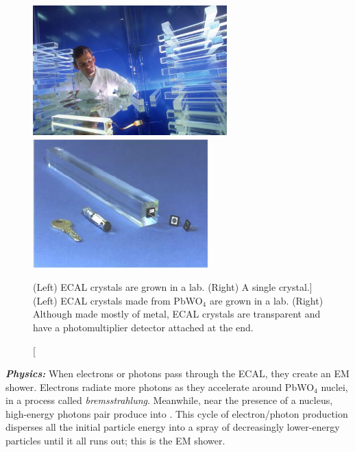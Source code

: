 \begin{figure}[pbth]
    \centering
    \includegraphics[height=5cm,keepaspectratio]{figures/cms/ecal/ECAL_crystals_fancy_lab.jpg}
    \includegraphics[height=5cm,keepaspectratio]{figures/cms/ecal/ECAL_crystal_sizecomparison.jpg}
    \caption
        [(Left) ECAL crystals are grown in a lab. (Right) A single crystal.]
        {
        (Left) ECAL crystals made from PbWO$_4$ are grown in a lab.
        (Right) Although made mostly of metal, ECAL crystals are transparent and have a photomultiplier detector attached at the end.
        } 
    \label{fig:ecal_crystals}
\end{figure}

\textit{\textbf{Physics:}}
When electrons or photons pass through the ECAL, they create an EM shower.
Electrons radiate more photons as they accelerate around PbWO$_4$ nuclei, in a process called \emph{bremsstrahlung}.
Meanwhile, near the presence of a nucleus, high-energy photons pair produce into \ee.
This cycle of electron/photon production disperses all the initial particle energy into a spray of decreasingly lower-energy particles until it all runs out; this is the EM shower.

